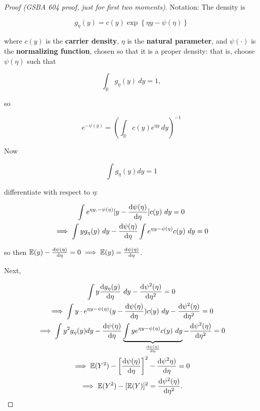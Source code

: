 \begin{proof}[Proof (GSBA 604 proof, just for first two moments)]

Notation: The density is 

\[
g_\eta(y) =  c(y) \exp \left\{  \eta y - \psi(\eta) \right\}
\]


where \(c(y)\) is the \textbf{carrier density}, \(\eta\) is the \textbf{natural parameter}, and \(\psi(\cdot)\) is the \textbf{normalizing function}, chosen so that it is a proper density: that is, choose \(\psi(\eta)\) such that

\[
\int_{\mathbb{R}} g_\eta(y) \ dy = 1,
\]

so

\[
e^{- \psi(y)} = \left( \int_{\mathbb{R}} c(y) e^{\eta y} \ dy \right)^{-1} 
\]

Now

\[
\int g_\eta(y) dy = 1
\]

differentiate with respect to \(\eta\):

\begin{multline}
\int e^{\eta y. - \psi(\eta)} [y - \frac{\mathrm{d} \psi(\eta)}{\mathrm{d} \eta} ] c(y) \ dy = 0 
\\ \implies \int y g_\eta(y) \ dy -  \frac{\mathrm{d} \psi(\eta)}{\mathrm{d} \eta} \int e^{\eta y - \psi(\eta)} c(y) \ dy = 0
\end{multline}

so then \(\mathbb{E}(y) - \frac{\mathrm{d} \psi(\eta)}{\mathrm{d} \eta} = 0 \implies \mathbb{E}(y) = \frac{\mathrm{d} \psi(\eta)}{\mathrm{d} \eta}\). 

Next,

\begin{multline*}
\int y \frac{\mathrm{d} g_\eta(y)}{\mathrm{d} \eta} \ dy - \frac{\mathrm{d} \psi^2(\eta)}{\mathrm{d} \eta^2} = 0 
\\ \implies \int y \cdot e^{\eta y - \psi(\eta)} (y - \frac{\mathrm{d} \psi(\eta)}{\mathrm{d} \eta}) c(y) \ dy - \frac{\mathrm{d} \psi^2(\eta)}{\mathrm{d} \eta^2} = 0 
\\ \implies \int y^2 g_\eta(y) dy - \frac{\mathrm{d} \psi(\eta)}{\mathrm{d} \eta} \underbrace{ \int y e^{\eta y - \psi(\eta)} c(y) \ dy}_{\frac{\mathrm{d} \psi(\eta)}{\mathrm{d} \eta}} - \frac{\mathrm{d} \psi^2(\eta)}{\mathrm{d} \eta^2} = 0 
\\ \implies \mathbb{E}(Y^2) - \left[ \frac{\mathrm{d} \psi(\eta)}{\mathrm{d} \eta} \right]^2 - \frac{\mathrm{d} \psi^2\eta)}{\mathrm{d} \eta} = 0 
\\ \implies \mathbb{E}(Y^2) - [\mathbb{E}(Y)]^2 = \frac{\mathrm{d} \psi^2(\eta)}{\mathrm{d} \eta^2}.
\end{multline*}

\end{proof}

